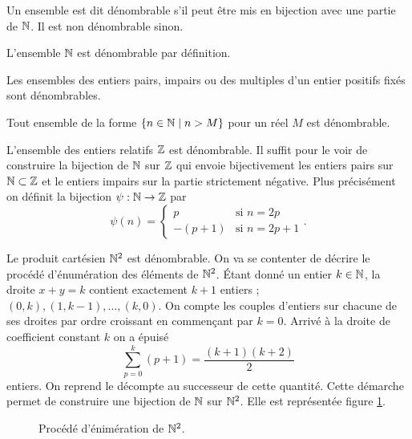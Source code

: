\documentclass[12pt, a4paper]{article}
\begin{document}
\begin{defn}
  Un ensemble est dit dénombrable s'il peut être mis en bijection avec
  une partie de $\mathbb{N}$. Il est non dénombrable sinon.
\end{defn}
\begin{exmp}
  L'ensemble $\mathbb{N}$ est dénombrable par définition.
\end{exmp}
\begin{exmp}
  Les ensembles des entiers pairs, impairs ou des multiples d'un entier
  positifs fixés sont dénombrables.
\end{exmp}
\begin{exmp}
  Tout ensemble de la forme $\{ n \in \mathbb{N} \mid n > M\}$ pour un réel $M$
  est dénombrable.
\end{exmp}
\begin{exmp}
  L'ensemble des entiers relatifs $\mathbb{Z}$ est dénombrable. Il suffit pour
  le voir de construire la bijection de $\mathbb{N}$ sur $\mathbb{Z}$ qui envoie
  bijectivement les entiers pairs sur $\mathbb{N} \subset \mathbb{Z}$ et le entiers
  impairs sur la partie strictement négative. Plus précisément on
  définit la bijection $\psi : \mathbb{N} \to \mathbb{Z}$ par
  \[
    \psi(n) = \left\{
      \begin{matrix}
        p & \textrm{si $n = 2p$} \\
        -(p+1) & \textrm{si $n = 2p+1$}
      \end{matrix}.
    \right.
  \]
\end{exmp}
\begin{exmp}
  Le produit cartésien $\mathbb{N}^2$ est dénombrable. On va se contenter de
  décrire le procédé d'énumération des éléments de $\mathbb{N}^2$. Étant donné
  un entier $k \in \mathbb{N}$, la droite $x + y = k$ contient exactement
  $k+1$ entiers ; $(0, k), (1, k-1), \ldots, (k, 0)$. On compte les
  couples d'entiers sur chacune de ses droites par ordre croissant en
  commen\c{c}ant par $k = 0$. Arrivé à la droite de coefficient
  constant $k$ on a épuisé
  \[
    \sum_{p=0}^k (p+1) = \frac{(k+1)(k+2)}{2}
  \]
  entiers. On reprend le décompte au successeur de cette quantité. Cette
  démarche permet de construire une bijection de $\mathbb{N}$ sur $\mathbb{N}^2$. Elle
  est représentée figure \ref{fig:N2denomb}.
\end{exmp}
\begin{figure}
  \centering
  \caption{Procédé d'énimération de $\mathbb{N}^2$.}
  \label{fig:N2denomb}
\end{figure}
\end{document}
